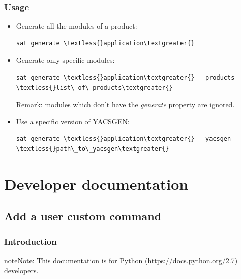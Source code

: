 \documentclass[a4paper,10pt,english]{sphinxmanual}
\begin{document}
\subsection{Usage}
\label{commands/generate:usage}\begin{itemize}
\item {} 
Generate all the modules of a product:

\begin{Verbatim}[commandchars=\\\{\}]
sat generate \textless{}application\textgreater{}
\end{Verbatim}

\item {} 
Generate only specific modules:

\begin{Verbatim}[commandchars=\\\{\}]
sat generate \textless{}application\textgreater{} --products \textless{}list\_of\_products\textgreater{}
\end{Verbatim}

Remark: modules which don't have the \emph{generate} property are ignored.

\item {} 
Use a specific version of YACSGEN:

\begin{Verbatim}[commandchars=\\\{\}]
sat generate \textless{}application\textgreater{} --yacsgen \textless{}path\_to\_yacsgen\textgreater{}
\end{Verbatim}

\end{itemize}


\chapter{Developer documentation}
\label{index:developer-documentation}\clearpage

\section{Add a user custom command}
\label{write_command:svn}\label{write_command:add-a-user-custom-command}\label{write_command::doc}

\subsection{Introduction}
\label{write_command:introduction}
\begin{notice}{note}{Note:}
This documentation is for \href{https://docs.python.org/2.7}{Python} (https://docs.python.org/2.7) developers.
\end{notice}
\end{document}
